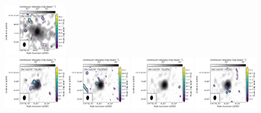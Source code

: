 \begin{figure}[htbp!]
  \includegraphics[width=0.24\textwidth]{./moment0/Set3_ID08_CH3CN_257527.pdf}
  \\
  \includegraphics[width=0.24\textwidth]{./moment0/Set3_ID10_CH3OH_243915.pdf}
  \includegraphics[width=0.24\textwidth]{./moment0/Set3_ID10_CH3OCHO_259342.pdf}
  \includegraphics[width=0.24\textwidth]{./moment0/Set3_ID10_CH3OCH3_259311.pdf}
  \includegraphics[width=0.24\textwidth]{./moment0/Set3_ID10_CH3CN_257527.pdf}
  \\
  \caption{}
\end{figure}
\renewcommand{\thefigure}{\arabic{figure}}